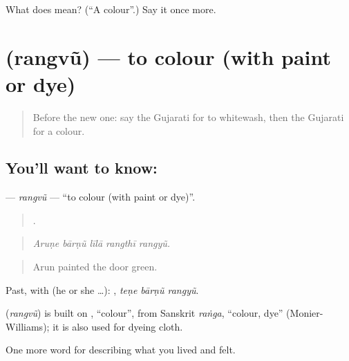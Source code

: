 \begin{tcolorbox}[breakable,colback=teal!4,colframe=teal!35!black,title={Before you move on}]
What does  mean? (\textquotedblleft{}A colour\textquotedblright{}.) Say it once more.
\end{tcolorbox}
\section[\texorpdfstring{\gu{રંગવું} (rangvũ)}{રંગવું (rangvũ)}]{ (rangvũ) — to colour (with paint or dye)}

\label{lesson:GU-C516-rangvu}



\begin{quote}
Before the new one: say the Gujarati for to whitewash, then the Gujarati for a colour.
\end{quote}

\subsection*{You'll want to know: }
\textbf{} — \emph{rangvũ} — \textquotedblleft{}to colour (with paint or dye)\textquotedblright{}.

\begin{quote}
    .
\end{quote}

\begin{quote}
\emph{Aruṇe bārṇũ līlā rangthī rangyũ.}
\end{quote}

\begin{quote}
Arun painted the door green.
\end{quote}

Past, with  (he or she …):   , \emph{teṇe bārṇũ rangyũ}.

\begin{cousinweb}
\textbf{} (\emph{rangvũ}) is built on \textbf{}, \textquotedblleft{}colour\textquotedblright{}, from Sanskrit \emph{raṅga}, \textquotedblleft{}colour, dye\textquotedblright{} (Monier-Williams); it is also used for dyeing cloth.
\end{cousinweb}

\begin{grammarlens}[title={What you've built}]
One more word for describing what you lived and felt.
\end{grammarlens}

